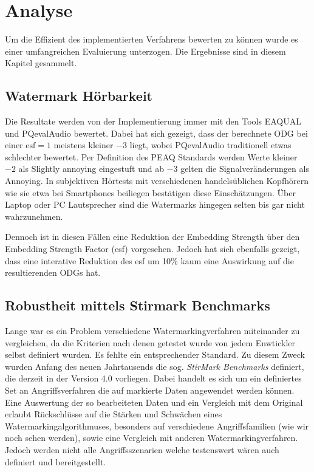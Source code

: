 \chapter{Analyse}
\label{ch:analyse}

Um die Effizient des implementierten Verfahrens bewerten zu können wurde es einer umfangreichen Evaluierung unterzogen. Die Ergebnisse sind in diesem Kapitel gesammelt. 

\section{Watermark Hörbarkeit}

Die Resultate werden von der Implementierung immer mit den Tools EAQUAL und PQevalAudio bewertet. Dabei hat sich gezeigt, dass der berechnete ODG bei einer $\mbox{esf}=1$ meistens kleiner $-3$ liegt, wobei PQevalAudio traditionell etwas schlechter bewertet. Per Definition des PEAQ Standards werden Werte kleiner $-2$ als \glqq{}Slightly annoying\grqq{} eingestuft und ab $-3$ gelten die Signalveränderungen als \glqq{}Annoying\grqq{}. In subjektiven Hörtests mit verschiedenen handelsüblichen Kopfhörern wie sie etwa bei Smartphones beiliegen bestätigen diese Einschätzungen. Über Laptop oder PC Lautsprecher sind die Watermarks hingegen selten bis gar nicht wahrzunehmen. 

Dennoch ist in diesen Fällen eine Reduktion der Embedding Strength über den Embedding Strength Factor (esf) vorgesehen. Jedoch hat sich ebenfalls gezeigt, dass eine interative Reduktion des esf um 10\% kaum eine Auswirkung auf die resultierenden ODGs hat.

\section{Robustheit mittels Stirmark Benchmarks}

Lange war es ein Problem verschiedene Watermarkingverfahren miteinander zu vergleichen, da die Kriterien nach denen getestet wurde von jedem Enwtickler selbst definiert wurden. Es fehlte ein entsprechender Standard. Zu diesem Zweck wurden Anfang des neuen Jahrtausends die sog. \textit{StirMark Benchmarks} definiert\cite{petitcolas2000watermarking}\cite{petitcolas2004stirmark}, die derzeit in der Version 4.0 vorliegen. Dabei handelt es sich um ein definiertes Set an Angriffsverfahren die auf markierte Daten angewendet werden können. Eine Auswertung der so bearbeiteten Daten und ein Vergleich mit dem Original erlaubt Rückschlüsse auf die Stärken und Schwächen eines Watermarkingalgorithmuses, besonders auf verschiedene Angriffsfamilien (wie wir noch sehen werden), sowie eine Vergleich mit anderen Watermarkingverfahren. Jedoch werden nicht alle Angriffsszenarien welche testenswert wären auch definiert und bereitgestellt\cite{steinebach2002stirmark}.

